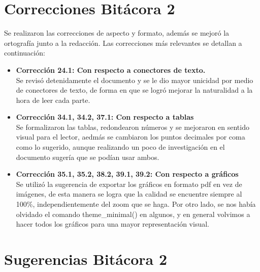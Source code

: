\section{Correcciones Bitácora 2}
Se realizaron las correcciones de aspecto y formato, además se mejoró la ortografía junto a la redacción. Las correcciones más relevantes se detallan a continuación:

\begin{itemize}
    \item \textbf{Corrección 24.1: Con respecto a conectores de texto.} \\
    Se revisó detenidamente el documento y se le dio mayor unicidad por medio de conectores de texto, de forma en que se logró mejorar la naturalidad a la hora de leer cada parte. 
    
    \item \textbf{Corrección 34.1, 34.2, 37.1: Con respecto a tablas} \\
    Se formalizaron las tablas, redondearon números y se mejoraron en sentido visual para el lector, aedmás se cambiaron los puntos decimales por coma como lo sugerido, aunque realizando un poco de investigación en el documento sugería que se podían usar ambos. 
    
    \item \textbf{Corrección 35.1, 35.2, 38.2, 39.1, 39.2: Con respecto a gráficos} \\
    Se utilizó la sugerencia de exportar los gráficos en formato pdf en vez de imágenes, de esta manera se logra que la calidad se encuentre siempre al 100\%, independientemente del zoom que se haga. Por otro lado, se nos había olvidado el comando theme\_minimal() en algunos, y en general volvimos a hacer todos los gráficos para una mayor representación visual. 
\end{itemize}

\section{Sugerencias Bitácora 2}

